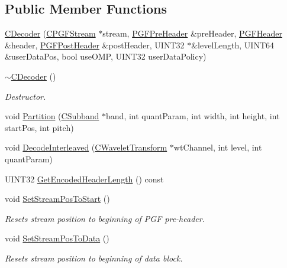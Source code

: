 \subsection*{Public Member Functions}
\begin{DoxyCompactItemize}
\item 
\mbox{\hyperlink{classCDecoder_acc4f2d5e39048b4dfd079d56dafd18fd}{C\+Decoder}} (\mbox{\hyperlink{classCPGFStream}{C\+P\+G\+F\+Stream}} $\ast$stream, \mbox{\hyperlink{structPGFPreHeader}{P\+G\+F\+Pre\+Header}} \&pre\+Header, \mbox{\hyperlink{structPGFHeader}{P\+G\+F\+Header}} \&header, \mbox{\hyperlink{structPGFPostHeader}{P\+G\+F\+Post\+Header}} \&post\+Header, U\+I\+N\+T32 $\ast$\&level\+Length, U\+I\+N\+T64 \&user\+Data\+Pos, bool use\+O\+MP, U\+I\+N\+T32 user\+Data\+Policy)
\item 
\mbox{\hyperlink{classCDecoder_acb3e9a62be775af9a88da18730cd6f0e}{$\sim$\+C\+Decoder}} ()
\begin{DoxyCompactList}\small\item\em Destructor. \end{DoxyCompactList}\item 
void \mbox{\hyperlink{classCDecoder_a61a588ddb407e323bb3647eb6f70fa6b}{Partition}} (\mbox{\hyperlink{classCSubband}{C\+Subband}} $\ast$band, int quant\+Param, int width, int height, int start\+Pos, int pitch)
\item 
void \mbox{\hyperlink{classCDecoder_a7112215e28ac56d75bdf4a5786f57a34}{Decode\+Interleaved}} (\mbox{\hyperlink{classCWaveletTransform}{C\+Wavelet\+Transform}} $\ast$wt\+Channel, int level, int quant\+Param)
\item 
U\+I\+N\+T32 \mbox{\hyperlink{classCDecoder_a4e9c1ffe92430bf2420b8da76f145fcf}{Get\+Encoded\+Header\+Length}} () const
\item 
void \mbox{\hyperlink{classCDecoder_ab043bb3599b2301bebd22527258ac4cf}{Set\+Stream\+Pos\+To\+Start}} ()
\begin{DoxyCompactList}\small\item\em Resets stream position to beginning of P\+GF pre-\/header. \end{DoxyCompactList}\item 
void \mbox{\hyperlink{classCDecoder_ae6d16df70a317f3dc805894cf6101fe2}{Set\+Stream\+Pos\+To\+Data}} ()
\begin{DoxyCompactList}\small\item\em Resets stream position to beginning of data block. \end{DoxyCompactList}\item 

\end{DoxyCompactItemize}
